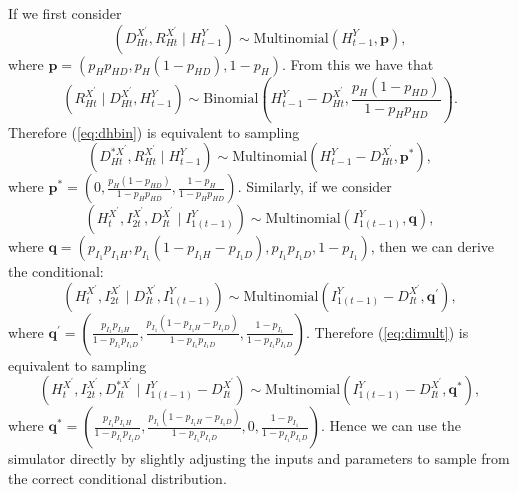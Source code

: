 \documentclass[a4paper]{article}
\newcommand{\bp}{\bm{p}}
\newcommand{\bq}{\bm{q}}
\begin{document}
If we first consider 
\begin{equation}
    \left(D^{X^\prime}_{Ht}, R^{X^\prime}_{Ht} \mid H^{Y}_{t - 1}\right) \sim \mbox{Multinomial}\left(H^{Y}_{t - 1}, \bp\right),
\end{equation}
where $\bp = \left(p_Hp_{HD}, p_H\left(1 - p_{HD}\right), 1 - p_H\right)$. From this we have that
\begin{equation}
    \left(R^{X^\prime}_{Ht} \mid D^{X^\prime}_{Ht}, H^{Y}_{t - 1}\right) \sim \mbox{Binomial}\left(H^{Y}_{t - 1} - D^{X^\prime}_{Ht}, \frac{p_H\left(1 - p_{HD}\right)}{1 - p_Hp_{HD}}\right).\label{eq:dhbin}
\end{equation}
Therefore (\ref{eq:dhbin}) is equivalent to sampling
\begin{equation}
    \left(D^{\ast X^\prime}_{Ht}, R^{X^\prime}_{Ht} \mid H^{Y}_{t - 1}\right) \sim \mbox{Multinomial}\left(H^{Y}_{t - 1} - D^{X^\prime}_{Ht}, \bp^\ast\right),
\end{equation}
where $\bp^\ast = \left(0, \frac{p_H\left(1 - p_{HD}\right)}{1 - p_Hp_{HD}}, \frac{1 - p_H}{1 - p_Hp_{HD}}\right)$. Similarly, if we consider
\begin{equation}
    \left(H^{X^\prime}_t, I^{X^\prime}_{2t}, D^{X^\prime}_{It} \mid I^{Y}_{1(t - 1)}\right) \sim \mbox{Multinomial}\left(I^{Y}_{1(t - 1)}, \bq\right),
\end{equation}
where $\bq = \left(p_{I_1}p_{I_1H}, p_{I_1}\left(1 - p_{I_1H} - p_{I_1D}\right), p_{I_1}p_{I_1D}, 1 - p_{I_1}\right)$, then we can derive the conditional:
\begin{equation}
    \left(H^{X^\prime}_t, I^{X^\prime}_{2t} \mid D^{X^\prime}_{It}, I^{Y}_{1(t - 1)}\right) \sim \mbox{Multinomial}\left(I^{Y}_{1(t - 1)} - D^{X^\prime}_{It}, \bq^\prime\right),\label{eq:dimult}
\end{equation}
where $\bq^\prime = \left(\frac{p_{I_1}p_{I_1H}}{1 - p_{I_1}p_{I_1D}}, \frac{p_{I_1}\left(1 - p_{I_1H} - p_{I_1D}\right)}{1 - p_{I_1}p_{I_1D}}, \frac{1 - p_{I_1}}{1 - p_{I_1}p_{I_1D}}\right)$. Therefore (\ref{eq:dimult}) is equivalent to sampling
\begin{equation}
    \left(H^{X^\prime}_t, I^{X^\prime}_{2t}, D^{\ast X^\prime}_{It} \mid I^{Y}_{1(t - 1)} - D^{X^\prime}_{It}\right) \sim \mbox{Multinomial}\left(I^{Y}_{1(t - 1)} - D^{X^\prime}_{It}, \bq^\ast\right),
\end{equation}
where $\bq^\ast = \left(\frac{p_{I_1}p_{I_1H}}{1 - p_{I_1}p_{I_1D}}, \frac{p_{I_1}\left(1 - p_{I_1H} - p_{I_1D}\right)}{1 - p_{I_1}p_{I_1D}}, 0, \frac{1 - p_{I_1}}{1 - p_{I_1}p_{I_1D}}\right)$. Hence we can use the simulator directly by slightly adjusting the inputs and parameters to sample from the correct conditional distribution.
\end{document}

